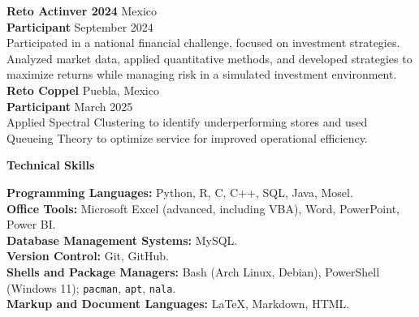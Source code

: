 \documentclass[9pt]{extarticle} %
\begin{document}
\textbf{Reto Actinver 2024} \hfill Mexico\\
\textbf{Participant} \hfill September 2024\\
Participated in a national financial challenge, focused on investment strategies. Analyzed market data, applied quantitative methods, and developed strategies to maximize returns while managing risk in a simulated investment environment.\\


\textbf{Reto Coppel} \hfill Puebla, Mexico\\
\textbf{Participant} \hfill March 2025\\
Applied Spectral Clustering to identify underperforming stores and used Queueing Theory to optimize service for improved operational efficiency.














\begin{center}
    \vspace{1ex}
    \textbf{Technical Skills}
    \vspace{-1ex}
\end{center}

\textbf{Programming Languages:} Python, R, C, C++, SQL, Java, Mosel.\\
\textbf{Office Tools:} Microsoft Excel (advanced, including VBA), Word, PowerPoint, Power BI.\\
\textbf{Database Management Systems:} MySQL.\\
\textbf{Version Control:} Git, GitHub.\\
\textbf{Shells and Package Managers:} Bash (Arch Linux, Debian), PowerShell (Windows 11); \texttt{pacman}, \texttt{apt}, \texttt{nala}.\\
\textbf{Markup and Document Languages:} LaTeX, Markdown, HTML.\\
\end{document}
